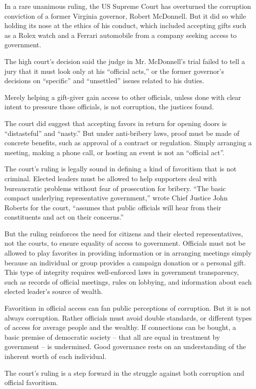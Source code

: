 In a rare unanimous ruling, the US Supreme Court has overturned the corruption conviction of a former Virginia governor, Robert McDonnell. But it did so while holding its nose at the ethics of his conduct, which included accepting gifts such as a Rolex watch and a Ferrari automobile from a company seeking access to government.


The high court's decision said the judge in Mr. McDonnell's trial failed to tell a jury that it must look only at his ``official acts,'' or the former governor's decisions on ``specific'' and ``unsettled'' issues related to his duties.


Merely helping a gift-giver gain access to other officials, unless done with clear intent to pressure those officials, is not corruption, the justices found.


The court did suggest that accepting favors in return for opening doors is ``distasteful'' and ``nasty.'' But under anti-bribery laws, proof must be made of concrete benefits, such as approval of a contract or regulation. Simply arranging a meeting, making a phone call, or hosting an event is not an ``official act''.


The court's ruling is legally sound in defining a kind of favoritism that is not criminal. Elected leaders must be allowed to help supporters deal with bureaucratic problems without fear of prosecution for bribery. ``The basic compact underlying representative government,'' wrote Chief Justice John Roberts for the court, ``assumes that public officials will hear from their constituents and act on their concerns.''


But the ruling reinforces the need for citizens and their elected representatives, not the courts, to ensure equality of access to government. Officials must not be allowed to play favorites in providing information or in arranging meetings simply because an individual or group provides a campaign donation or a personal gift. This type of integrity requires well-enforced laws in government transparency, such as records of official meetings, rules on lobbying, and information about each elected leader's source of wealth.


Favoritism in official access can fan public perceptions of corruption. But it is not always corruption. Rather officials must avoid double standards, or different types of access for average people and the wealthy. If connections can be bought, a basic premise of democratic society – that all are equal in treatment by government – is undermined. Good governance rests on an understanding of the inherent worth of each individual.


The court's ruling is a step forward in the struggle against both corruption and official favoritism.